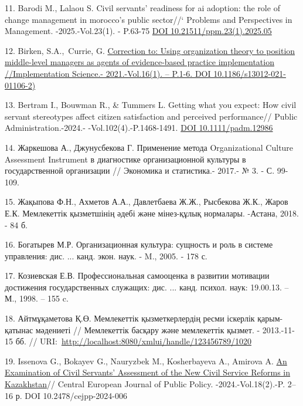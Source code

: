 11. Barodi M., Lalaou S. Civil servants' readiness for ai adoption: the
role of change management in morocco's public sector//` Problems and
Perspectives in Management. -2025.-Vol.23(1). - P.63-75
\href{http://dx.doi.org/10.21511/ppm.23(1).2025.05}{DOI
10.21511/ppm.23(1).2025.05}

12. Birken, S.A.,~Currie, G.
\href{https://www.scopus.com/record/display.uri?eid=2-s2.0-85104625356&origin=reflist&sort=plf-f&src=s&sid=9294c12779ee47479a1a0997e8991897&sot=b&sdt=b&sl=99&s=TITLE\%28An+Examination+of+Civil+Servants\%e2\%80\%99+Assessment+of++the+New+Civil+Service+Reforms+in+Kazakhstan\%29}{Correction
to: Using organization theory to position middle-level managers as
agents of evidence-based practice implementation //Implementation
Science.- 2021.-Vol.16(1). -- P.1-6. DOI 10.1186/s13012-021-01106-2)}

13. Bertram I., Bouwman R., \& Tummers L. Getting what you expect: How
civil servant stereotypes affect citizen satisfaction and perceived
performance// Public Administration.-2024.- -Vol.102(4).-P.1468-1491.
\href{https://doi.org/10.1111/padm.12986}{DOI 10.1111/padm.12986}

14. Жаркешова А., Джунусбекова Г. Применение метода Organizational
Culture Assessment Instrument в диагностике организационной культуры в
государственной организации // Экономика и статистика.- 2017.- № 3. - С.
99-109.

15. Жақыпова Ф.Н., Ахметов А.А., Давлетбаева Ж.Ж., Рысбекова Ж.К., Жаров
Е.К. Мемлекеттік қызметшінің әдебі және мінез-құлық нормалары. -Астана,
2018. - 84 б.

16. Богатырев М.Р. Организационная культура: сущность и роль в системе
управления: дис. ... канд. экон. наук. - M., 2005. - 178 с.

17. Козиевская Е.В. Профессиональная самооценка в развитии мотивации
достижения государственных служащих: дис. ... канд. психол. наук:
19.00.13. -- М., 1998. -- 155 c.

18. Айтмұқаметова Қ.Ө. Мемлекеттік қызметкерлердің ресми іскерлік
қарым-қатынас мәдениеті // Мемлекеттік басқару және мемлекеттік қызмет.
- 2013.-11-15 бб. //
URI:~\href{http://localhost:8080/xmlui/handle/123456789/1020}{http://localhost:8080/xmlui/handle/123456789/1020}

19. Issenova G., Bokayev G., Nauryzbek M., Kosherbayeva A., Amirova A.
\href{https://www.scopus.com/record/display.uri?eid=2-s2.0-85208677871&origin=resultslist&sort=plf-f&src=s&sot=b&sdt=b&s=TITLE\%28An+Examination+of+Civil+Servants\%E2\%80\%99+Assessment+of++the+New+Civil+Service+Reforms+in+Kazakhstan\%29&sessionSearchId=9294c12779ee47479a1a0997e8991897&relpos=0}{\hfill\break
An Examination of Civil Servants'{} Assessment of the New
Civil Service Reforms in Kazakhstan}// Central European Journal of
Public Policy. -2024.-Vol.18(2).-P. 2--16 р. DOI 10.2478/cejpp-2024-006

